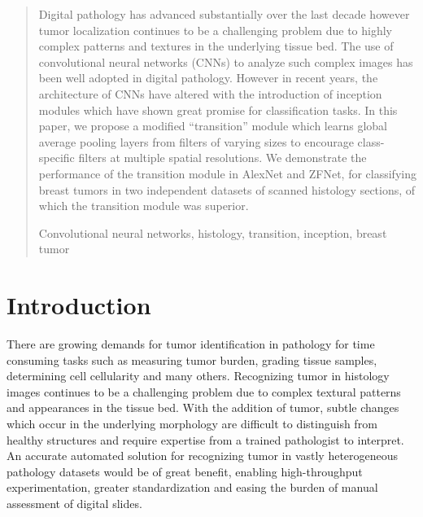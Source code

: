 \documentclass[runningheads,a4paper]{llncs}
\newcommand{\keywords}[1]{\par\addvspace\baselineskip
\noindent\keywordname\enspace\ignorespaces#1}
\begin{document}
\begin{abstract}
Digital pathology has advanced substantially over the last decade however tumor localization continues to be a challenging problem due to highly complex patterns and textures in the underlying tissue bed. The use of convolutional neural networks (CNNs) to analyze such complex images has been well adopted in digital pathology. However in recent years, the architecture of CNNs have altered with the introduction of inception modules which have shown great promise for classification tasks. In this paper, we propose a modified ``transition'' module which learns global average pooling layers from filters of varying sizes to encourage class-specific filters at multiple spatial resolutions. We demonstrate the performance of the transition module in AlexNet and ZFNet, for classifying breast tumors in two independent datasets of scanned histology sections, of which the transition module was superior.

\keywords{Convolutional neural networks, histology, transition, inception, breast tumor}
\end{abstract}

\section{Introduction}
There are growing demands for tumor identification in pathology for time consuming tasks such as measuring tumor burden, grading tissue samples, determining cell cellularity and many others. Recognizing tumor in histology images continues to be a challenging problem due to complex textural patterns and appearances in the tissue bed. With the addition of tumor, subtle changes which occur in the underlying morphology are difficult to distinguish from healthy structures and require expertise from a trained pathologist to interpret. An accurate automated solution for recognizing tumor in vastly heterogeneous pathology datasets would be of great benefit, enabling high-throughput experimentation, greater standardization and easing the burden of manual assessment of digital slides.
\end{document}
